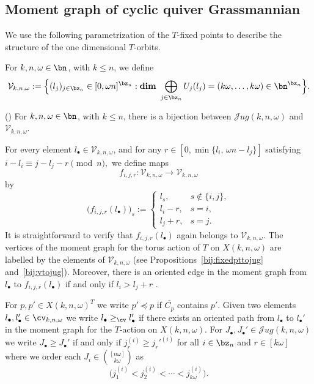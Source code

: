 \documentclass[10pt, a4paper, reqno]{amsart}
\begin{document}
\subsection{Moment graph of cyclic quiver Grassmannian }\label{ss:mg_of_cqG} 

We use the following parametrization of the $T$-fixed points to describe the structure of the one dimensional $T$-orbits.
\begin{defe}
	For $k,n,\omega\in\bn$, with $k\leq n$, we define 
	\begin{equation}
		\mathcal{V}_{k,n,\omega}:=\Big\{(l_j)_{j\in\bz_n}\in [0,\omega n]^{\bz_n}: \mathbf{dim}~\bigoplus_{j\in\bz_n}U_j(l_j)=(k\omega,\ldots,k\omega)\in \bn^{\bz_n}\Big\}.
	\end{equation}
\end{defe}
\begin{propo}\label{bij:vtojug}(\cite[Proposition 3.2]{flp24})
	For $k,n,\omega\in\bn$, with $k\leq n$, there is a bijection between $\mathscr{J}ug(k,n,\omega)$ and $	\mathcal{V}_{k,n,\omega}$.
\end{propo}


For every element $l_\bullet \in \mathcal{V}_{k,n,\omega}$, and for any 
$r \in [0, \min\{l_i,\, \omega n - l_j\}]$ satisfying  $i - l_i \equiv j - l_j - r \pmod{n},$
we define maps 
\[
f_{i,j,r} : \mathcal{V}_{k,n,\omega} \to \mathcal{V}_{k,n,\omega}
\]
by
\[
\big(f_{i,j,r}(l_\bullet)\big)_s :=
\begin{cases}
	l_s, & s \notin \{i,j\},\\[4pt]
	l_i - r, & s = i,\\[4pt]
	l_j + r, & s = j.
\end{cases}
\]
It is straightforward to verify that $f_{i,j,r}(l_\bullet)$ again belongs to $\mathcal{V}_{k,n,\omega}$.
The vertices of the moment graph for the torus action of $T$ on $X(k,n,\omega)$ 
are labelled by the elements of $\mathcal{V}_{k,n,\omega}$ 
(see Propositions~\ref{bij:fixedpttojug} and~\ref{bij:vtojug}).
Moreover, there is an oriented edge in the moment graph from 
$l_\bullet$ to $f_{i,j,r}(l_\bullet)$ if and only if $l_i > l_j + r$ \cite{flp24}.

For $p, p'\in X(k,n,\omega)^T$ we write $p'\preceq 
p$ if $\overline{C_p}$ contains $p'$.   Given two elements $l_\bullet, l_\bullet'\in \cv_{k,n,\omega}$ we write $l_\bullet \geq_\cv l_\bullet'$ if there exists an oriented path from $l_\bullet $ to $l_\bullet'$ in the moment graph for the $T$-action on $X(k,n,\omega)$.  For $J_\bullet, J_\bullet'\in \mathscr{J}ug(k,n,\omega)$ we write $J_\bullet\geq J_\bullet'$ if and only if $j_r^{(i)}\geq j_r'^{(i)}$ for all $i\in \bz_n$ and $r\in [k\omega]$ where we order each $J_i\in \binom{[n\omega]}{k\omega}$ as  \[\big(j_1^{(i)}<j_2^{(i)}<\cdots<j_{k\omega}^{(i)}\big).\]
\end{document}
